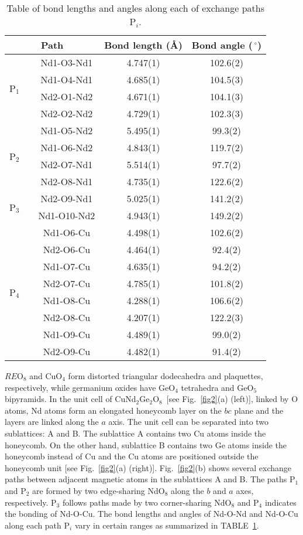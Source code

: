 \documentclass[aps,prl,reprint,amsmath,amssymb,superscriptaddress,showpacs]{revtex4-1}
\begin{document}
\begin{table}[h]
\caption{\label{table1}Table of bond lengths and angles along each of exchange paths P$_i$.}
\centering
\renewcommand{\arraystretch}{2}
\begin{tabular}{c c c c c}
\hline
\hline
 \multicolumn{3}{c}{Path} & Bond length ({\AA}) & Bond angle ($\,^{\circ}\mathrm{}$)\\
 \hline
 \multirow{4}{*}{P$_1$} & & Nd1-O3-Nd1 & 4.747(1) & 102.6(2) \\ 
& & Nd1-O4-Nd1 & 4.685(1) & 104.5(3) \\ 
& & Nd2-O1-Nd2 & 4.671(1) & 104.1(3) \\
& & Nd2-O2-Nd2 & 4.729(1) & 102.3(3) \\
 \hline
 \multirow{4}{*}{P$_2$} & & Nd1-O5-Nd2 & 5.495(1) & 99.3(2) \\ 
& & Nd1-O6-Nd2 & 4.843(1) & 119.7(2) \\ 
& & Nd2-O7-Nd1 & 5.514(1) & 97.7(2) \\
& & Nd2-O8-Nd1 & 4.735(1) & 122.6(2) \\
 \hline
 \multirow{2}{*}{P$_3$} & & Nd2-O9-Nd1 & 5.025(1) & 141.2(2) \\ 
& & Nd1-O10-Nd2 & 4.943(1) & 149.2(2) \\ 
 \hline
 \multirow{8}{*}{P$_4$} & & Nd1-O6-Cu & 4.498(1) & 102.6(2) \\ 
& & Nd2-O6-Cu & 4.464(1) & 92.4(2) \\ 
& & Nd1-O7-Cu & 4.635(1) & 94.2(2) \\
& & Nd2-O7-Cu & 4.785(1) & 101.8(2) \\
& & Nd1-O8-Cu & 4.288(1) & 106.6(2) \\ 
& & Nd2-O8-Cu & 4.207(1) & 122.2(3) \\
& & Nd1-O9-Cu & 4.489(1) & 99.0(2) \\
& & Nd2-O9-Cu & 4.482(1) & 91.4(2) \\
\hline
\hline
 \end{tabular}
\end{table}

$RE$O$_8$ and CuO$_4$ form distorted triangular dodecahedra and plaquettes, respectively, while  germanium oxides have GeO$_4$ tetrahedra and GeO$_5$ bipyramids. In the unit cell of CuNd$_2$Ge$_2$O$_8$~[see Fig.~\ref{fig2}(a) (left)], linked by O atoms, Nd atoms form an elongated honeycomb layer on the $bc$ plane and the layers are linked along the $a$ axis. The unit cell can be separated into two sublattices: A and B. The sublattice A contains two Cu atoms inside the honeycomb. On the other hand, sublattice B contains two Ge atoms inside the honeycomb instead of Cu and the Cu atoms are positioned outside the honeycomb unit [see Fig.~\ref{fig2}(a) (right)].  Fig.~\ref{fig2}(b) shows several exchange paths between adjacent magnetic atoms in the sublattices A and B. The paths P$_1$ and P$_2$ are formed by two edge-sharing NdO$_8$ along the $b$ and $a$ axes, respectively. P$_3$ follows paths made by two corner-sharing NdO$_8$ and P$_4$ indicates the bonding of Nd-O-Cu. The bond lengths and angles of Nd-O-Nd and Nd-O-Cu along each path P$_i$ vary in certain ranges as summarized in TABLE~\ref{table1}.
\end{document}
